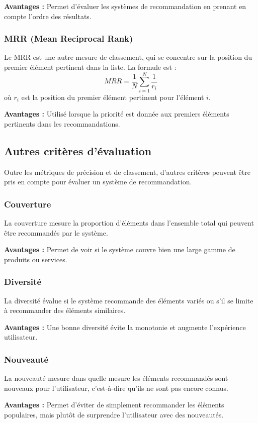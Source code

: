 \textbf{Avantages :} Permet d’évaluer les systèmes de recommandation en prenant en compte l’ordre des résultats.

\subsubsection{MRR (Mean Reciprocal Rank)}
Le MRR est une autre mesure de classement, qui se concentre sur la position du premier élément pertinent dans la liste. La formule est :
\[
MRR = \frac{1}{N} \sum_{i=1}^{N} \frac{1}{r_i}
\]
où \(r_i\) est la position du premier élément pertinent pour l’élément \(i\).

\textbf{Avantages :} Utilisé lorsque la priorité est donnée aux premiers éléments pertinents dans les recommandations.

\subsection{Autres critères d’évaluation}

Outre les métriques de précision et de classement, d’autres critères peuvent être pris en compte pour évaluer un système de recommandation.

\subsubsection{Couverture}
La couverture mesure la proportion d’éléments dans l'ensemble total qui peuvent être recommandés par le système.

\textbf{Avantages :} Permet de voir si le système couvre bien une large gamme de produits ou services.

\subsubsection{Diversité}
La diversité évalue si le système recommande des éléments variés ou s’il se limite à recommander des éléments similaires.

\textbf{Avantages :} Une bonne diversité évite la monotonie et augmente l’expérience utilisateur.

\subsubsection{Nouveauté}
La nouveauté mesure dans quelle mesure les éléments recommandés sont nouveaux pour l'utilisateur, c'est-à-dire qu’ils ne sont pas encore connus.

\textbf{Avantages :} Permet d’éviter de simplement recommander les éléments populaires, mais plutôt de surprendre l'utilisateur avec des nouveautés.

